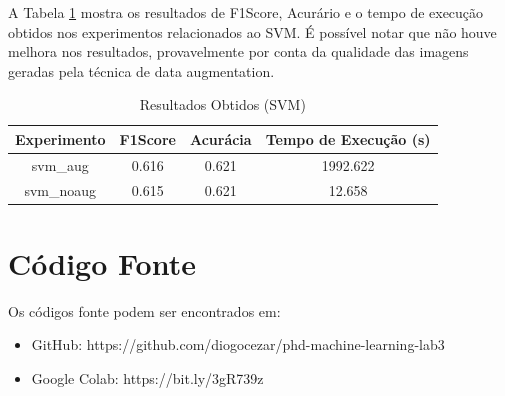 \documentclass[12pt]{article}
\begin{document}
A Tabela \ref{tab:experiment_svm_final} mostra os resultados de F1Score, Acurário e o tempo de execução obtidos nos experimentos relacionados ao SVM. É possível notar que não houve melhora nos resultados, provavelmente por conta da qualidade das imagens geradas pela técnica de data augmentation.

\begin{table}[!htb]
  \centering
  \begin{tabular}{|c|c|c|c|}
    \hline
    \textbf{Experimento} & \textbf{F1Score} & \textbf{Acurácia} & \textbf{Tempo de Execução (s)} \\ \hline
    svm\_aug             & 0.616            & 0.621             & 1992.622                       \\ \hline
    svm\_noaug           & 0.615            & 0.621             & 12.658                         \\ \hline
  \end{tabular}
  \caption{Resultados Obtidos (SVM)}
  \label{tab:experiment_svm_final}
\end{table}

\newpage

\section{Código Fonte}

Os códigos fonte podem ser encontrados em:

\begin{itemize}
  \item GitHub: https://github.com/diogocezar/phd-machine-learning-lab3
  \item Google Colab: https://bit.ly/3gR739z
\end{itemize}
\end{document}
